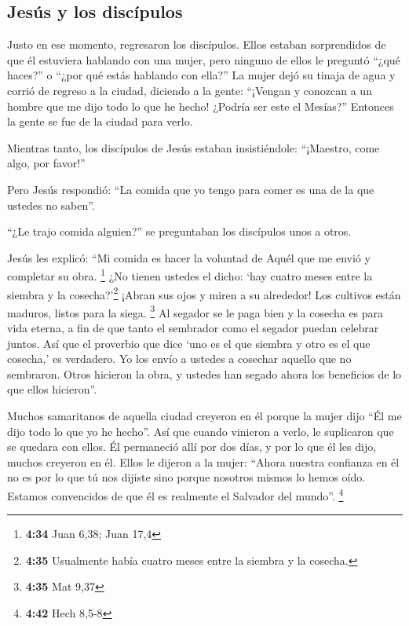 \hypertarget{jesuxfas-y-los-discuxedpulos}{%
\subsection{Jesús y los discípulos}\label{jesuxfas-y-los-discuxedpulos}}

 Justo en ese momento, regresaron los discípulos. Ellos
estaban sorprendidos de que él estuviera hablando con una mujer, pero
ninguno de ellos le preguntó ``¿qué haces?'' o ``¿por qué estás hablando
con ella?''  La mujer dejó su tinaja de agua y corrió de
regreso a la ciudad, diciendo a la gente:  ``¡Vengan y
conozcan a un hombre que me dijo todo lo que he hecho! ¿Podría ser este
el Mesías?''  Entonces la gente se fue de la ciudad para
verlo.

 Mientras tanto, los discípulos de Jesús estaban
insistiéndole: ``¡Maestro, come algo, por favor!''

 Pero Jesús respondió: ``La comida que yo tengo para
comer es una de la que ustedes no saben''.

 ``¿Le trajo comida alguien?'' se preguntaban los
discípulos unos a otros.

 Jesús les explicó: ``Mi comida es hacer la voluntad de
Aquél que me envió y completar su obra. \footnote{\textbf{4:34} Juan
  6,38; Juan 17,4}  ¿No tienen ustedes el dicho: `hay
cuatro meses entre la siembra y la cosecha?'\footnote{\textbf{4:35}
  Usualmente había cuatro meses entre la siembra y la cosecha.} ¡Abran
sus ojos y miren a su alrededor! Los cultivos están maduros, listos para
la siega. \footnote{\textbf{4:35} Mat 9,37}  Al segador
se le paga bien y la cosecha es para vida eterna, a fin de que tanto el
sembrador como el segador puedan celebrar juntos.  Así
que el proverbio que dice `uno es el que siembra y otro es el que
cosecha,' es verdadero.  Yo los envío a ustedes a
cosechar aquello que no sembraron. Otros hicieron la obra, y ustedes han
segado ahora los beneficios de lo que ellos hicieron''.

 Muchos samaritanos de aquella ciudad creyeron en él
porque la mujer dijo ``Él me dijo todo lo que yo he hecho''.
 Así que cuando vinieron a verlo, le suplicaron que se
quedara con ellos. Él permaneció allí por dos días,  y
por lo que él les dijo, muchos creyeron en él.  Ellos le
dijeron a la mujer: ``Ahora nuestra confianza en él no es por lo que tú
nos dijiste sino porque nosotros mismos lo hemos oído. Estamos
convencidos de que él es realmente el Salvador del mundo''. \footnote{\textbf{4:42}
  Hech 8,5-8}

